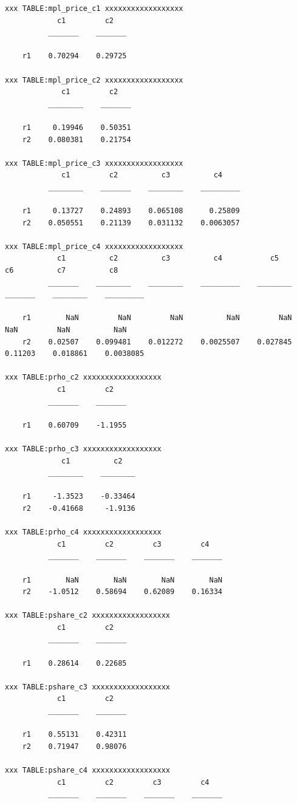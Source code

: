 \documentclass[
]{book}
\begin{document}
\begin{verbatim}
xxx TABLE:mpl_price_c1 xxxxxxxxxxxxxxxxxx
            c1         c2   
          _______    _______

    r1    0.70294    0.29725

xxx TABLE:mpl_price_c2 xxxxxxxxxxxxxxxxxx
             c1         c2   
          ________    _______

    r1     0.19946    0.50351
    r2    0.080381    0.21754

xxx TABLE:mpl_price_c3 xxxxxxxxxxxxxxxxxx
             c1         c2          c3          c4    
          ________    _______    ________    _________

    r1     0.13727    0.24893    0.065108      0.25809
    r2    0.050551    0.21139    0.031132    0.0063057

xxx TABLE:mpl_price_c4 xxxxxxxxxxxxxxxxxx
            c1          c2          c3          c4           c5         c6          c7          c8    
          _______    ________    ________    _________    ________    _______    ________    _________

    r1        NaN         NaN         NaN          NaN         NaN        NaN         NaN          NaN
    r2    0.02507    0.099481    0.012272    0.0025507    0.027845    0.11203    0.018861    0.0038085

xxx TABLE:prho_c2 xxxxxxxxxxxxxxxxxx
            c1         c2   
          _______    _______

    r1    0.60709    -1.1955

xxx TABLE:prho_c3 xxxxxxxxxxxxxxxxxx
             c1          c2   
          ________    ________

    r1     -1.3523    -0.33464
    r2    -0.41668     -1.9136

xxx TABLE:prho_c4 xxxxxxxxxxxxxxxxxx
            c1         c2         c3         c4   
          _______    _______    _______    _______

    r1        NaN        NaN        NaN        NaN
    r2    -1.0512    0.58694    0.62089    0.16334

xxx TABLE:pshare_c2 xxxxxxxxxxxxxxxxxx
            c1         c2   
          _______    _______

    r1    0.28614    0.22685

xxx TABLE:pshare_c3 xxxxxxxxxxxxxxxxxx
            c1         c2   
          _______    _______

    r1    0.55131    0.42311
    r2    0.71947    0.98076

xxx TABLE:pshare_c4 xxxxxxxxxxxxxxxxxx
            c1         c2         c3         c4   
          _______    _______    _______    _______


\end{verbatim}
\end{document}
